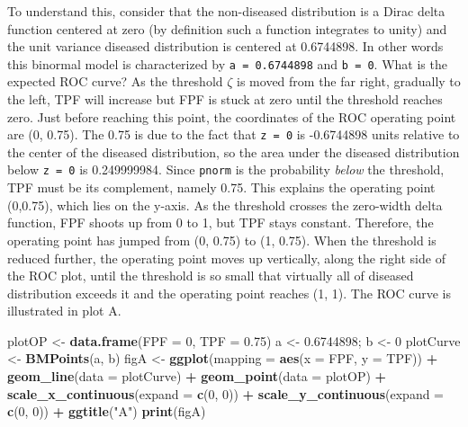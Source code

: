 \documentclass[
]{book}
\newenvironment{Shaded}{\begin{snugshade}}{\end{snugshade}}
\newcommand{\DataTypeTok}[1]{\textcolor[rgb]{0.13,0.29,0.53}{#1}}
\newcommand{\DecValTok}[1]{\textcolor[rgb]{0.00,0.00,0.81}{#1}}
\newcommand{\FloatTok}[1]{\textcolor[rgb]{0.00,0.00,0.81}{#1}}
\newcommand{\KeywordTok}[1]{\textcolor[rgb]{0.13,0.29,0.53}{\textbf{#1}}}
\newcommand{\NormalTok}[1]{#1}
\newcommand{\OperatorTok}[1]{\textcolor[rgb]{0.81,0.36,0.00}{\textbf{#1}}}
\newcommand{\StringTok}[1]{\textcolor[rgb]{0.31,0.60,0.02}{#1}}
\begin{document}
To understand this, consider that the non-diseased distribution is a Dirac delta function centered at zero (by definition such a function integrates to unity) and the unit variance diseased distribution is centered at 0.6744898. In other words this binormal model is characterized by \texttt{a\ =\ 0.6744898} and \texttt{b\ =\ 0}. What is the expected ROC curve? As the threshold \(\zeta\) is moved from the far right, gradually to the left, TPF will increase but FPF is stuck at zero until the threshold reaches zero. Just before reaching this point, the coordinates of the ROC operating point are (0, 0.75). The 0.75 is due to the fact that \texttt{z\ =\ 0} is -0.6744898 units relative to the center of the diseased distribution, so the area under the diseased distribution below \texttt{z\ =\ 0} is 0.249999984. Since \texttt{pnorm} is the probability \emph{below} the threshold, TPF must be its complement, namely 0.75. This explains the operating point (0,0.75), which lies on the y-axis. As the threshold crosses the zero-width delta function, FPF shoots up from 0 to 1, but TPF stays constant. Therefore, the operating point has jumped from (0, 0.75) to (1, 0.75). When the threshold is reduced further, the operating point moves up vertically, along the right side of the ROC plot, until the threshold is so small that virtually all of diseased distribution exceeds it and the operating point reaches (1, 1). The ROC curve is illustrated in plot A.

\begin{Shaded}
\begin{Highlighting}[]
\NormalTok{plotOP <-}\StringTok{ }\KeywordTok{data.frame}\NormalTok{(}\DataTypeTok{FPF =} \DecValTok{0}\NormalTok{, }\DataTypeTok{TPF =} \FloatTok{0.75}\NormalTok{)}
\NormalTok{a <-}\StringTok{ }\FloatTok{0.6744898}\NormalTok{; b <-}\StringTok{ }\DecValTok{0}
\NormalTok{plotCurve <-}\StringTok{ }\KeywordTok{BMPoints}\NormalTok{(a, b)}
\NormalTok{figA <-}\StringTok{ }\KeywordTok{ggplot}\NormalTok{(}\DataTypeTok{mapping =} \KeywordTok{aes}\NormalTok{(}\DataTypeTok{x =}\NormalTok{ FPF, }\DataTypeTok{y =}\NormalTok{ TPF)) }\OperatorTok{+}\StringTok{ }
\StringTok{  }\KeywordTok{geom_line}\NormalTok{(}\DataTypeTok{data =}\NormalTok{ plotCurve) }\OperatorTok{+}\StringTok{ }
\StringTok{  }\KeywordTok{geom_point}\NormalTok{(}\DataTypeTok{data =}\NormalTok{ plotOP)  }\OperatorTok{+}\StringTok{ }
\StringTok{  }\KeywordTok{scale_x_continuous}\NormalTok{(}\DataTypeTok{expand =} \KeywordTok{c}\NormalTok{(}\DecValTok{0}\NormalTok{, }\DecValTok{0}\NormalTok{)) }\OperatorTok{+}\StringTok{ }
\StringTok{  }\KeywordTok{scale_y_continuous}\NormalTok{(}\DataTypeTok{expand =} \KeywordTok{c}\NormalTok{(}\DecValTok{0}\NormalTok{, }\DecValTok{0}\NormalTok{)) }\OperatorTok{+}
\StringTok{  }\KeywordTok{ggtitle}\NormalTok{(}\StringTok{"A"}\NormalTok{)}
\KeywordTok{print}\NormalTok{(figA)}
\end{Highlighting}
\end{Shaded}
\end{document}
